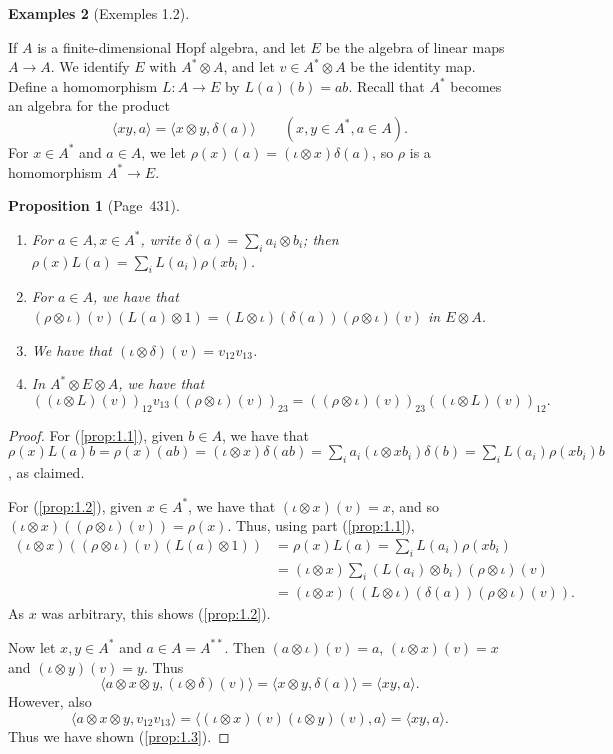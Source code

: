 \documentclass[a4paper,12pt]{article}
\theoremstyle{plain}
\newtheorem{proposition}{Proposition}[section]
\theoremstyle{definition}
\newtheorem{examples}[proposition]{Examples}
\newcommand{\ip}[2]{{\langle {#1} , {#2} \rangle}}
\begin{document}
\begin{examples}[Exemples 1.2]
\begin{enumerate}
If $A$ is a finite-dimensional Hopf algebra, and let $E$ be the algebra of
linear maps $A\rightarrow A$.  We identify $E$ with $A^*\otimes A$,
and let $v\in A^*\otimes A$ be the identity map.  Define a homomorphism
$L:A\rightarrow E$ by $L(a)(b) = ab$.  Recall that $A^*$ becomes an algebra
for the product
\[ \ip{xy}{a} = \ip{x\otimes y}{\delta(a)} \qquad
(x,y\in A^*, a\in A). \]
For $x\in A^*$ and $a\in A$, we let $\rho(x)(a) = (\iota\otimes x)\delta(a)$,
so $\rho$ is a homomorphism $A^* \rightarrow E$.

\begin{proposition}[Page~431]
\begin{enumerate}
\item\label{prop:1.1} For $a\in A, x\in A^*$, write
  $\delta(a) = \sum_i a_i \otimes b_i$;
  then $\rho(x) L(a) = \sum_i L(a_i) \rho(xb_i)$.
\item\label{prop:1.2} For $a\in A$, we have that
  $(\rho\otimes\iota)(v) (L(a)\otimes 1)
  = (L\otimes\iota)(\delta(a))(\rho\otimes\iota)(v)$ in $E\otimes A$.
\item\label{prop:1.3} We have that $(\iota\otimes\delta)(v)=v_{12} v_{13}$.
\item\label{prop:1.4} In $A^*\otimes E\otimes A$, we have that
\[ ((\iota\otimes L)(v))_{12} v_{13} ((\rho\otimes\iota)(v))_{23}
= ((\rho\otimes\iota)(v))_{23} ((\iota\otimes L)(v))_{12}. \]
\end{enumerate}
\end{proposition}
\begin{proof}
For (\ref{prop:1.1}), given $b\in A$, we have that $\rho(x) L(a) b
= \rho(x)(ab) = (\iota\otimes x)\delta(ab)
= \sum_i a_i (\iota\otimes xb_i)\delta(b)
= \sum_i L(a_i) \rho(xb_i) b$, as claimed.

For (\ref{prop:1.2}), given $x\in A^*$, we have that $(\iota\otimes x)(v) = x$,
and so $(\iota\otimes x)((\rho\otimes\iota)(v)) = \rho(x)$.  Thus, using part
(\ref{prop:1.1}),
\begin{align*}
(\iota\otimes x)((\rho\otimes\iota)(v)(L(a)\otimes 1)) &= \rho(x)L(a)
= \sum_i L(a_i) \rho(xb_i) \\
&= (\iota\otimes x) \sum_i (L(a_i)\otimes b_i)(\rho\otimes\iota)(v) \\
&= (\iota\otimes x)((L\otimes\iota)(\delta(a))(\rho\otimes\iota)(v)).
\end{align*}
As $x$ was arbitrary, this shows (\ref{prop:1.2}).

Now let $x,y\in A^*$ and $a\in A=A^{**}$.  Then $(a\otimes\iota)(v)=a$,
$(\iota\otimes x)(v)=x$ and $(\iota\otimes y)(v)=y$.  Thus
\[ \ip{a\otimes x\otimes y}{(\iota\otimes\delta)(v)} = 
\ip{x\otimes y}{\delta(a)} = \ip{xy}{a}. \]
However, also
\[ \ip{a\otimes x\otimes y}{v_{12} v_{13}}
= \ip{(\iota\otimes x)(v) (\iota\otimes y)(v)}{a}
= \ip{xy}{a}. \]
Thus we have shown (\ref{prop:1.3}).


\end{proof}
\end{enumerate}
\end{examples}
\end{document}
